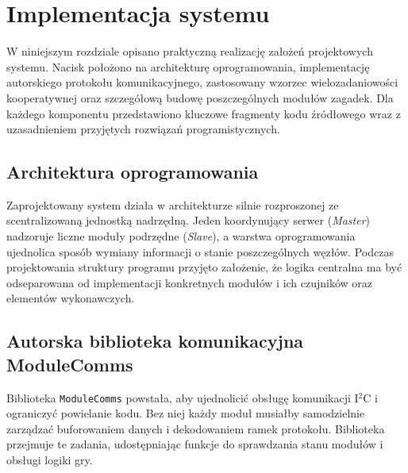 \documentclass{SGGW-thesis}
\begin{document}
\chapter{Implementacja systemu}
W niniejszym rozdziale opisano praktyczną realizację założeń projektowych systemu. Nacisk położono na architekturę oprogramowania, implementację autorskiego protokołu komunikacyjnego, zastosowany wzorzec wielozadaniowości kooperatywnej oraz szczegółową budowę poszczególnych modułów zagadek. Dla każdego komponentu przedstawiono kluczowe fragmenty kodu źródłowego wraz z uzasadnieniem przyjętych rozwiązań programistycznych.

\section{Architektura oprogramowania}
Zaprojektowany system działa w architekturze silnie rozproszonej ze scentralizowaną jednostką nadrzędną. Jeden koordynujący serwer (\textit{Master}) nadzoruje liczne moduły podrzędne (\textit{Slave}), a warstwa oprogramowania ujednolica sposób wymiany informacji o stanie poszczególnych węzłów. Podczas projektowania struktury programu przyjęto założenie, że logika centralna ma być odseparowana od implementacji konkretnych modułów i ich czujników oraz elementów wykonawczych.

\section{Autorska biblioteka komunikacyjna ModuleComms}
Biblioteka \texttt{ModuleComms} powstała, aby ujednolicić obsługę komunikacji I$^2$C i ograniczyć powielanie kodu. Bez niej każdy moduł musiałby samodzielnie zarządzać buforowaniem danych i dekodowaniem ramek protokołu. Biblioteka przejmuje te zadania, udostępniając funkcje do sprawdzania stanu modułów i obsługi logiki gry.
\end{document}
